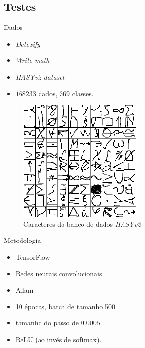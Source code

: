 \documentclass{beamer}
\begin{document}
    \subsection{Testes}
    \begin{frame}{Dados}
        \begin{itemize}
            \item \emph{Detexify}
            \item \emph{Write-math}
            \item \emph{HASYv2 dataset}
            \item $168233$ dados, $369$ classes.
        \end{itemize}
        \begin{figure}
            \centering
            \includegraphics[width=.45\textwidth,height=.45\textheight]{sampleshvsy2.png}
            \caption{Caracteres do banco de dados \emph{HASYv2}}
            \label{fig:samplehasy}
        \end{figure}
    \end{frame}
    
    \begin{frame}{Metodologia}
        \begin{itemize}
            \item TensorFlow
            \item Redes neurais convolucionais
            \item Adam
            \item 10 épocas, batch de tamanho 500
            \item tamanho do passo de $0.0005$
            \item ReLU (ao invés de softmax). 
        \end{itemize}    
    \end{frame}
    
\end{document}
